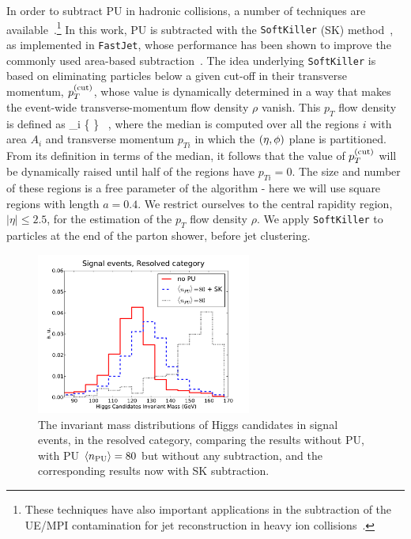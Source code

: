 %
In order to subtract PU in hadronic collisions, a number of techniques
are available~\cite{Cacciari:2009dp,TheATLAScollaboration:2013pia,Butterworth:2008iy,Cacciari:2007fd,Krohn:2009th,Krohn:2013lba,Ellis:2009me,Bertolini:2014bba,Cacciari:2014gra,Cacciari:2014jta,Berta:2014eza,Larkoski:2014wba}.\footnote{
These techniques have also important applications in the subtraction
of the UE/MPI contamination for jet reconstruction
in heavy ion collisions~\cite{Cacciari:2010te}.
}
%
In this work, PU  is subtracted
with the {\tt SoftKiller} (SK)
method~\cite{Cacciari:2014gra}, as implemented in {\tt FastJet},
whose performance has been shown to
improve the commonly used area-based subtraction~\cite{Cacciari:2009dp}.
%
The idea underlying {\tt SoftKiller} is based on eliminating particles
below a given cut-off in their transverse momentum, $p_T^{\rm (cut)}$, whose
value is dynamically determined in a way that makes the event-wide
transverse-momentum flow density $\rho$ vanish.
%
This $p_T$ flow density is defined as
\be
\rho{}_i \Bigg\{ \Bigg\} \, ,
\ee
where the median is computed over all the regions $i$ with area
$A_i$ and transverse momentum $p_{Ti}$ in which the $\left( \eta,\phi\right)$ plane
is partitioned.
%
From its definition in terms of the median,
it follows that the value of $p_T^{(\rm cut)}$
will be dynamically raised until half of the regions have
$p_{Ti}=0$.
%
The size and number of these regions is a free parameter of the algorithm -
here we will use square regions with length $a=0.4$.
%
We restrict ourselves to the central rapidity region,
$|\eta| \le 2.5$, for the estimation of the
$p_T$ flow density $\rho$.
%
We apply {\tt SoftKiller}
to particles at the end of the parton shower, before
jet clustering.


\begin{figure}[t]
  \begin{center}
  \includegraphics[width=0.63\textwidth]{plots/m_htot_res_signal_PUnoSK.pdf}
    \caption{\small
    The invariant mass distributions of Higgs candidates in signal
events, in the resolved category, comparing the results without PU,
with PU $\left\langle n_{\rm PU}\right\rangle=80$ but without any subtraction, and the
corresponding results now with SK subtraction.
}
\label{fig:PUvalidation}
\end{center}
\end{figure}

